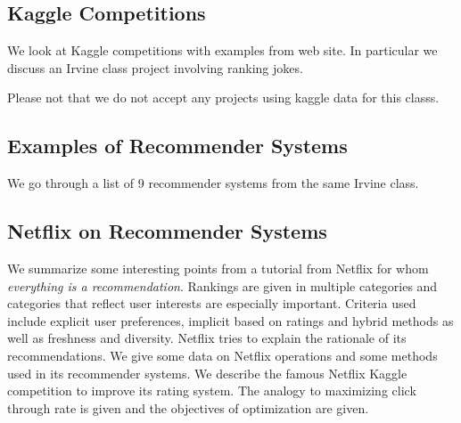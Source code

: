 

\subsection{Kaggle Competitions}

We look at Kaggle competitions with examples from web site. In
particular we discuss an Irvine class project involving ranking jokes.


\begin{IU}

Please not that we do not accept any projects using kaggle data for
this classs.

\end{IU}

\subsection{Examples of Recommender Systems}

We go through a list of 9 recommender systems from the same Irvine
class.



\subsection{Netflix on Recommender Systems}

We summarize some interesting points from a tutorial from Netflix for
whom \textit{everything is a recommendation}. Rankings are given in multiple
categories and categories that reflect user interests are especially
important. Criteria used include explicit user preferences, implicit
based on ratings and hybrid methods as well as freshness and diversity.
Netflix tries to explain the rationale of its recommendations. We give
some data on Netflix operations and some methods used in its recommender
systems. We describe the famous Netflix Kaggle competition to improve
its rating system. The analogy to maximizing click through rate is given
and the objectives of optimization are given.


